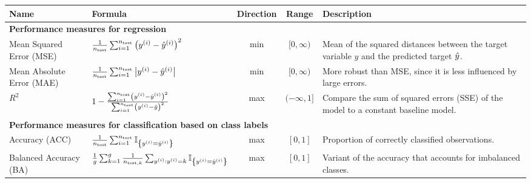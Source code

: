 \documentclass[landscape, 10pt, margin=0cm]{article}
\begin{document}
\begin{table}[h!]
\centering
\small
\begin{tabular}{llcc p{9cm}}
\toprule
Name & Formula & Direction & Range & Description \\
\midrule
\multicolumn{5}{l}{\textbf{Performance measures for regression}}\\[0.15em]
Mean Squared Error (MSE)        & $\frac{1}{n_{\mathrm{test}}} \sum_{i = 1}^{n_{\mathrm{test}}} \left(y^{(i)} - \hat{y}^{(i)}\right)^2 $  & min & $[0, \infty)$ &  Mean of the squared distances between the target variable $y$ and the predicted target $\hat{y}$.\\
Mean Absolute Error (MAE)       & $\frac{1}{n_{\mathrm{test}}} \sum_{i = 1}^{n_{\mathrm{test}}} \left\lvert y^{(i)} - \hat{y}^{(i)}\right\rvert$ & min & $[0, \infty)$  & More robust than MSE, since it is less influenced by large errors. \\
$R^2$        & $1 - \frac{\sum_{i = 1}^{n_{\mathrm{test}}} \left(y^{(i)} - \hat{y}^{(i)}\right)^2}{\sum_{i = 1}^{n_{\mathrm{test}}} \left(y^{(i)} - \bar{y}\right)^2}$    & max & $(-\infty, 1]$  & Compare the sum of squared errors (SSE) of the model to a constant baseline model. \\ 
\multicolumn{5}{l}{\textbf{Performance measures for classification based on class labels}}\\[0.2em]
Accuracy (ACC)            & $\frac{1}{n_{\mathrm{test}}} \sum_{i = 1}^{n_{\mathrm{test}}} \mathbb{I}_{\left\{y^{(i)} = \hat{y}^{(i)}\right\}}$                                   & max & $[0, 1]$      & Proportion of correctly classified observations. \\
Balanced Accuracy (BA)    & $\frac{1}{g} \sum_{k=1}^g \frac{1}{n_{\text{test},k}} \sum_{y^{(i)}: y^{(i)} = k} \mathbb{I}_{\left\{y^{(i)} = \hat{y}^{(i)}\right\}}$ & max & $[0, 1]$      & Variant of the accuracy that accounts for imbalanced classes. \\


\end{tabular}
\end{table}
\end{document}
